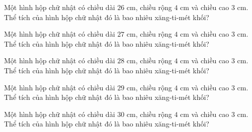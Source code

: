 \begin{ex}
  Một hình hộp chữ nhật có chiều dài $26\text{ cm}$, chiều rộng $4\text{ cm}$ và chiều cao $3\text{ cm}$. Thể tích của hình hộp chữ nhật đó là bao nhiêu xăng-ti-mét khối?
\end{ex}

\begin{ex}
  Một hình hộp chữ nhật có chiều dài $27\text{ cm}$, chiều rộng $4\text{ cm}$ và chiều cao $3\text{ cm}$. Thể tích của hình hộp chữ nhật đó là bao nhiêu xăng-ti-mét khối?
\end{ex}

\begin{ex}
  Một hình hộp chữ nhật có chiều dài $28\text{ cm}$, chiều rộng $4\text{ cm}$ và chiều cao $3\text{ cm}$. Thể tích của hình hộp chữ nhật đó là bao nhiêu xăng-ti-mét khối?
\end{ex}

\begin{ex}
  Một hình hộp chữ nhật có chiều dài $29\text{ cm}$, chiều rộng $4\text{ cm}$ và chiều cao $3\text{ cm}$. Thể tích của hình hộp chữ nhật đó là bao nhiêu xăng-ti-mét khối?
\end{ex}

\begin{ex}
  Một hình hộp chữ nhật có chiều dài $30\text{ cm}$, chiều rộng $4\text{ cm}$ và chiều cao $3\text{ cm}$. Thể tích của hình hộp chữ nhật đó là bao nhiêu xăng-ti-mét khối?
\end{ex}
